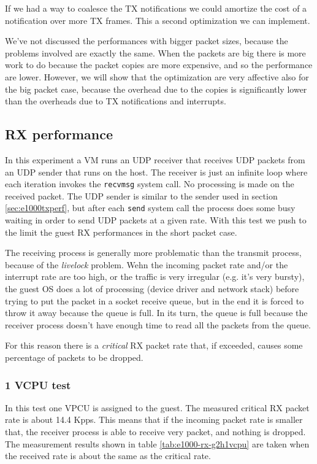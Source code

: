 If we had a way to coalesce the TX notifications we could amortize the cost of a notification over more TX frames. This
a second optimization we can implement.

\vspace{0.5cm}

We've not discussed the performances with bigger packet sizes, because the problems involved are exactly the same. When the packets are 
big there is more work to do because the packet copies are more expensive, and so the performance are lower. However, we will show that
the optimization are very affective also for the big packet case, because the overhead due to the copies is significantly lower than
the overheads due to TX notifications and interrupts.



\subsection{RX performance}
In this experiment a VM runs an UDP receiver that receives UDP packets from an UDP sender that runs on the host. The receiver is just an 
infinite loop where each iteration invokes the \texttt{recvmsg} system call. No processing is made on the received packet.
The UDP sender is similar to the sender used in section \ref{sec:e1000txperf}, but after each \texttt{send} system call the process
does some busy waiting in order to send UDP packets at a given rate.
With this test we push to the limit the guest RX performances in the short packet case.

\vspace{0.5cm}

The receiving process is generally more problematic than the transmit process, because of the \emph{livelock} problem.
Wehn the incoming packet rate and/or the interrupt rate are too high, or the traffic is very irregular (e.g. it's very bursty), the guest
OS does a lot of processing (device driver and network stack) before trying to put the packet in a socket receive queue, but in the end it
is forced to throw it away because the queue is full. In its turn, the queue is full because the receiver process doesn't have enough
time to read all the packets from the queue.

For this reason there is a \emph{critical} RX packet rate that, if exceeded, causes some percentage of packets to be dropped.


\subsubsection{1 VCPU test}
\label{sec:e1000-rx-g2h1vcpu}
In this test one VPCU is assigned to the guest. The measured critical RX packet rate is about 14.4 Kpps.
This means that if the incoming packet rate is smaller that, the receiver process is able to receive very packet, and nothing is dropped.
The measurement results shown in table \ref{tab:e1000-rx-g2h1vcpu} are taken when the received rate is about the same as the critical
rate.

